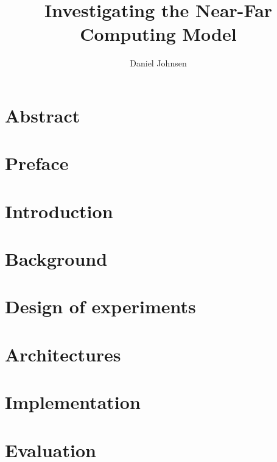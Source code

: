 \documentclass[UKenglish]{duo/ifimaster}  %
\title{Investigating the Near-Far Computing Model}        %
\author{Daniel Johnsen}                      %
\begin{document}
\duoforside[dept={Department of Informatics},   %
  program={Programming and System architecture},  %
  long]                                        %

\frontmatter{}
\chapter*{Abstract}


\tableofcontents{}
\listoffigures{}
\listoftables{}

\chapter*{Preface}


\mainmatter{}


\chapter{Introduction}


\chapter{Background}
 


\chapter{Design of experiments}\label{chapter:design_of_experiments}





\chapter{Architectures}\label{chapter:architectures} %


\chapter{Implementation}\label{chapter:implementation}



\chapter{Evaluation}\label{chapter:evaluation}

\end{document}
